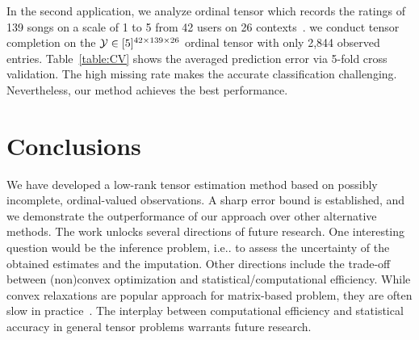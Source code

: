 \documentclass{article}
\theoremstyle{plain}
\theoremstyle{definition}
\begin{document}
\begin{table}[http]
\centering
{}

\caption{\footnotesize Comparison of prediction error in the HPC and InCarMusic. Standard errors are reported in parentheses.}\label{table:CV}
\end{table}
\vspace{-.4cm}
In the second application, we analyze ordinal tensor which records the ratings of 139 songs on a scale of 1 to 5 from 42 users  on 26 contexts~\citep{baltrunas2011incarmusic}. 
we conduct tensor completion on the $\mathcal{Y}\in[5]^{42\times139\times26}$ ordinal tensor with only 2,844 observed entries.
 Table~\ref{table:CV} shows the averaged prediction error via 5-fold cross validation. The high missing rate  makes the accurate classification challenging. Nevertheless, our method achieves the best performance.

\vspace{-.3cm}
\section{Conclusions}
\vspace{-.2cm}
We have developed a low-rank tensor estimation method based on possibly incomplete, ordinal-valued observations. A sharp error bound is established, and we demonstrate the outperformance of our approach over other alternative methods. The work unlocks several directions of future research. One interesting question would be the inference problem, i.e.. to assess the uncertainty of the obtained estimates and the imputation. Other directions include the trade-off between (non)convex optimization and statistical/computational efficiency. While convex relaxations are popular approach for matrix-based problem, they are often slow in practice~\cite{chen2019non}. The interplay between computational efficiency and statistical accuracy in general tensor problems warrants future research.



\end{document}
